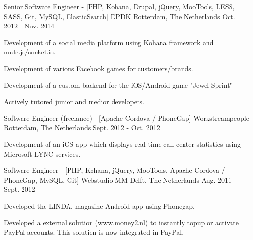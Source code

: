 \begin{cventries}
  \cventry
    {Senior Software Engineer - [PHP, Kohana, Drupal, jQuery, MooTools, LESS, SASS, Git, MySQL, ElasticSearch]} %
    {DPDK} %
    {Rotterdam, The Netherlands} %
    {Oct. 2012 - Nov. 2014} %
    {
      \begin{cvitems} %
        \item {Development of a social media platform using Kohana framework and node.js/socket.io.}
        \item {Development of various Facebook games for customers/brands.}
        \item {Development of a custom backend for the iOS/Android game "Jewel Sprint"}
        \item {Actively tutored junior and medior developers.}
      \end{cvitems}
    }

  \cventry
    {Software Engineer (freelance) - [Apache Cordova / PhoneGap]} %
    {Workstreampeople} %
    {Rotterdam, The Netherlands} %
    {Sept. 2012 - Oct. 2012} %
    {
      \begin{cvitems} %
        \item {Development of an iOS app which displays real-time call-center statistics using Microsoft LYNC services.}
      \end{cvitems}
    }

  \cventry
    {Software Engineer - [PHP, Kohana, jQuery, MooTools, Apache Cordova / PhoneGap, MySQL, Git]} %
    {Webstudio MM} %
    {Delft, The Netherlands} %
    {Aug. 2011 - Sept. 2012} %
    {
      \begin{cvitems} %
        \item {Developed the LINDA. magazine Android app using Phonegap.}
        \item {Developed a external solution (www.money2.nl) to instantly topup or activate PayPal accounts. This solution is now integrated in PayPal.}
      \end{cvitems}
    }


\end{cventries}
